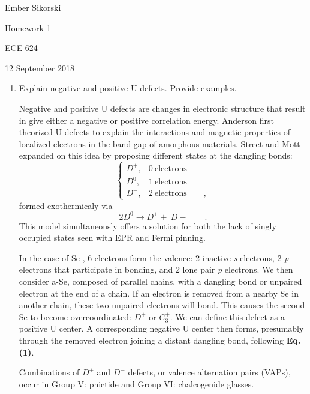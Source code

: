 \documentclass[12pt]{elsarticle}
\newcommand{\vs}{\vspace{2mm}}
\newcommand{\rr}[1]{\mbox{#1}}
\begin{document}
\begin{flushright}
	Ember Sikorski\par
	Homework 1\par
	ECE 624\par 
	12 September 2018
\end{flushright}


\begin{enumerate}
\item Explain negative and positive U defects. Provide examples. 
\vs
\par 
Negative and positive U defects are changes in electronic structure that result in give either a negative or positive correlation energy. Anderson \cite{Anderson1975} first theorized U defects to explain the interactions and magnetic properties of localized electrons in the band gap of amorphous materials. Street and Mott \cite{Street1975} expanded on this idea by proposing different states at the dangling bonds:
\begin{equation*}
\begin{cases}
D^{+}, & 0 \ \rr{electrons}\\
D^{0}, & 1 \ \rr{electrons} \\
D^{-}, & 2 \ \rr{electrons} \qquad ,
\end{cases}
\end{equation*}
formed exothermicaly via
\begin{equation}
2D^{0} \rightarrow D^{+}  +\  D{-} \qquad .
\end{equation}
This model simultaneously offers a solution for both the lack of singly occupied states seen with EPR and Fermi pinning.\par
\vs 
In the case of Se \cite{Mott1987,Zallen1983}, 6 electrons form the valence: 2 inactive \emph{s} electrons, 2 \emph{p} electrons that participate in bonding, and 2 lone pair \emph{p} electrons. We then consider a-Se, composed of parallel chains, with a dangling bond or unpaired electron at the end of a chain. If an electron is removed from a nearby Se in another chain, these two unpaired electrons will bond. This causes the second Se to become overcoordinated: $D^{+}$ or $C^{+}_{3}$. We can define this defect as a positive U center. A corresponding negative U center then forms, presumably through the removed electron joining a distant dangling bond, following \textbf{Eq. (1)}.
\par \vs  
Combinations of $D^{+}$ and $D^{-}$ defects, or valence alternation pairs (VAPs), occur in Group V: pnictide and Group VI: chalcogenide glasses.





\end{enumerate}
\end{document}
